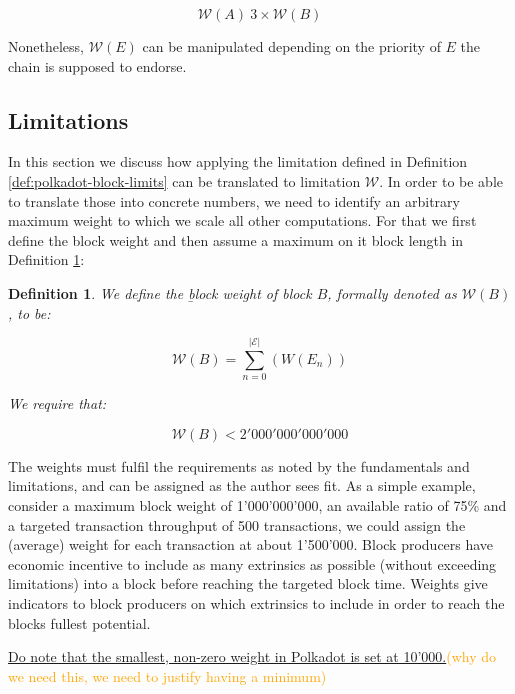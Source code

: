 \documentclass[11pt,a4paper]{article}
\newtheorem{definition}{Definition}
\newcommand{\syed}[2]{{\underline{#1}}\textcolor{orange}{(#2)}}
\newcommand{\TWF}{\ensuremath{\mathcal{W}}}
\begin{document}
\[
\TWF(A)~3\times \TWF(B)
\]

Nonetheless, $\TWF(E)$ can be manipulated depending on the priority of $E$ the
chain is supposed to endorse.

\subsection{Limitations}\label{sec:limitations}

In this section we discuss how applying the limitation defined in Definition
\ref{def:polkadot-block-limits} can be translated to limitation $\TWF$. In order
to be able to translate those into concrete numbers, we need to identify an
arbitrary maximum weight to which we scale all other computations. For that we
first define the block weight and then assume a maximum on it block length in
Definition \ref{def:block-weight}:

\begin{definition}
  \label{def:block-weight} We define the {\b block weight} of block $B$,
  formally denoted as  $\TWF(B)$, to be:

  \[
    \TWF(B) = \sum^{|\mathcal{E}|}_{n = 0} (W(E_n))
  \]

  We require that:

  \[
    \TWF(B) < 2'000'000'000'000
  \]
\end{definition}

The weights must fulfil the requirements as noted by the fundamentals and
limitations, and can be assigned as the author sees fit. As a simple example,
consider a maximum block weight of 1'000'000'000, an available ratio of 75\% and
a targeted transaction throughput of 500 transactions, we could assign the
(average) weight for each transaction at about 1'500'000. Block producers have
economic incentive to include as many extrinsics as possible (without exceeding
limitations) into a block before reaching the targeted block time. Weights give
indicators to block producers on which extrinsics to include in order to reach
the blocks fullest potential.
\newline

\syed{Do note that the smallest, non-zero weight in Polkadot is set at 10'000.}{why do we need this, we need to justify having a minimum}
\end{document}
